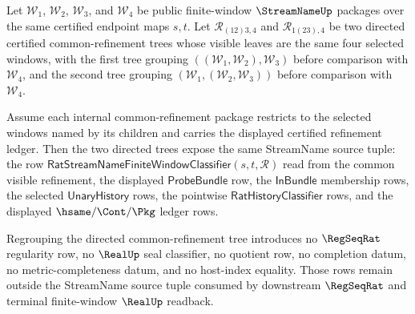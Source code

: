 \begin{theorem}
\label{thm:streamname-directed-common-refinement-source-associativity}
Let $\mathcal W_1$, $\mathcal W_2$, $\mathcal W_3$, and $\mathcal W_4$ be
public finite-window $\StreamNameUp$ packages over the same certified
endpoint maps $s,t$. Let $\mathcal R_{(12)3,4}$ and $\mathcal R_{1(23),4}$
be two directed certified common-refinement trees whose visible leaves are the
same four selected windows, with the first tree grouping
$((\mathcal W_1,\mathcal W_2),\mathcal W_3)$ before comparison with
$\mathcal W_4$, and the second tree grouping
$(\mathcal W_1,(\mathcal W_2,\mathcal W_3))$ before comparison with
$\mathcal W_4$.

Assume each internal common-refinement package restricts to the selected
windows named by its children and carries the displayed certified refinement
ledger. Then the two directed trees expose the same StreamName source tuple:
the row
$\mathsf{RatStreamNameFiniteWindowClassifier}(s,t,\mathcal R)$ read from the
common visible refinement, the displayed $\mathsf{ProbeBundle}$ row, the
$\mathsf{InBundle}$ membership rows, the selected $\mathsf{UnaryHistory}$
rows, the pointwise $\mathsf{RatHistoryClassifier}$ rows, and the displayed
$\hsame/\Cont/\Pkg$ ledger rows.

Regrouping the directed common-refinement tree introduces no $\RegSeqRat$
regularity row, no $\RealUp$ seal classifier, no quotient row, no completion
datum, no metric-completeness datum, and no host-index equality. Those rows
remain outside the StreamName source tuple consumed by downstream
$\RegSeqRat$ and terminal finite-window $\RealUp$ readback.
\end{theorem}

